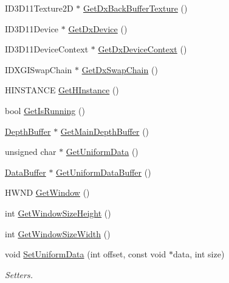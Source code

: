 \begin{DoxyCompactItemize}
I\+D3\+D11\+Texture2D $\ast$ \hyperlink{class_direct_x_manager_a99ac3db0b44425089a176fc741b4726d}{Get\+Dx\+Back\+Buffer\+Texture} ()
\item 
I\+D3\+D11\+Device $\ast$ \hyperlink{class_direct_x_manager_abb96057eb5bf224ef98060bd34b48751}{Get\+Dx\+Device} ()
\item 
I\+D3\+D11\+Device\+Context $\ast$ \hyperlink{class_direct_x_manager_ae9c3888bc7917e6ea3259d7816fe108a}{Get\+Dx\+Device\+Context} ()
\item 
I\+D\+X\+G\+I\+Swap\+Chain $\ast$ \hyperlink{class_direct_x_manager_a310a11a8113c758033f6b73fdde53030}{Get\+Dx\+Swap\+Chain} ()
\item 
H\+I\+N\+S\+T\+A\+N\+CE \hyperlink{class_direct_x_manager_a9cc5d9f93f5c2527db03de9dfe39bddf}{Get\+H\+Instance} ()
\item 
bool \hyperlink{class_direct_x_manager_a4270aa51fbde3ca7257e2904972a606b}{Get\+Is\+Running} ()
\item 
\hyperlink{class_depth_buffer}{Depth\+Buffer} $\ast$ \hyperlink{class_direct_x_manager_abf6b3476bf3f3e93a15d878d3fb0d96c}{Get\+Main\+Depth\+Buffer} ()
\item 
unsigned char $\ast$ \hyperlink{class_direct_x_manager_a3f0de0a051dbb65f80eb1f947d00c4cd}{Get\+Uniform\+Data} ()
\item 
\hyperlink{class_data_buffer}{Data\+Buffer} $\ast$ \hyperlink{class_direct_x_manager_a3ecf250110570278558a06be31c98837}{Get\+Uniform\+Data\+Buffer} ()
\item 
H\+W\+ND \hyperlink{class_direct_x_manager_a51978215008055fa610f4eafd39fd8f8}{Get\+Window} ()
\item 
int \hyperlink{class_direct_x_manager_a49d8a5684c325e88886e5fa5e1d83089}{Get\+Window\+Size\+Height} ()
\item 
int \hyperlink{class_direct_x_manager_aebaff0bb77f5b660ec5ea25b7a131229}{Get\+Window\+Size\+Width} ()
\item 
void \hyperlink{class_direct_x_manager_aae3c1e2ebb395bfec27e2f15ed6b8c80}{Set\+Uniform\+Data} (int offset, const void $\ast$data, int size)
\begin{DoxyCompactList}\small\item\em Setters. \end{DoxyCompactList}\end{DoxyCompactItemize}
